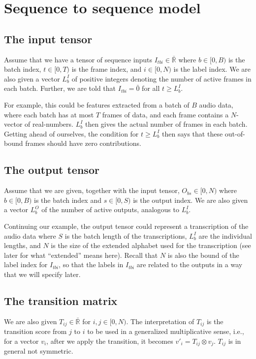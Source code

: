 \documentclass[a4paper]{article}
\begin{document}
\section{Sequence to sequence model}

\subsection{The input tensor}

Assume that we have a tensor of sequence inputs $I_{tbi} \in \bar{\mathbb{R}}$ where $b \in [0, B)$ is the batch index, $t \in [0, T)$ is the frame index, and $i \in [0, N)$ is the label index. We are also given a vector $L^I_b$ of positive integers denoting the number of active frames in each batch. Further, we are told that $I_{tbi} = \bar{0}$ for all $t \geq L^I_b$.

For example, this could be features extracted from a batch of $B$ audio data, where each batch has at most $T$ frames of data, and each frame contains a $N$-vector of real-numbers. $L^I_b$ then gives the actual number of frames in each batch. Getting ahead of ourselves, the condition for $t \geq L^I_b$ then says that these out-of-bound frames should have zero contributions.

\subsection{The output tensor}

Assume that we are given, together with the input tensor, $O_{bs} \in [0, N)$ where $b \in [0, B)$ is the batch index and $s \in [0, S)$ is the output index. We are also given a vector $L^O_b$ of the number of active outputs, analogous to $L^I_b$.

Continuing our example, the output tensor could represent a transcription of the audio data where $S$ is the batch length of the transcriptions, $L^I_b$ are the individual lengths, and $N$ is the size of the extended alphabet used for the transcription (see later for what ``extended'' means here). Recall that $N$ is also the bound of the label index for $I_{tbi}$, so that the labels in $I_{tbi}$ are related to the outputs in a way that we will specify later.

\subsection{The transition matrix}

We are also given $T_{ij} \in \bar{\mathbb{R}}$ for $i, j \in [0, N)$. The interpretation of $T_{ij}$ is the transition score from $j$ to $i$ to be used in a generalized multiplicative sense, i.e., for a vector $v_i$, after we apply the transition, it becomes $v'_{i} = T_{ij}\otimes v_j$. $T_{ij}$ is in general not symmetric.
\end{document}
